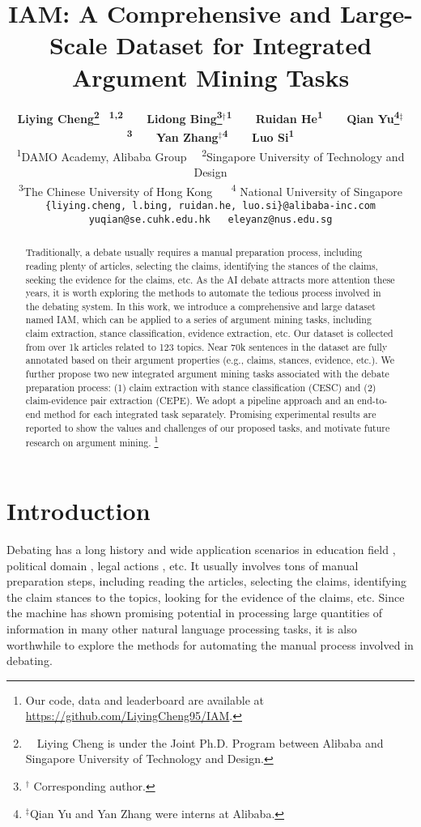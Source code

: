 \documentclass[11pt]{article}
\title{IAM: A Comprehensive and Large-Scale Dataset for Integrated Argument Mining Tasks}
\author{
\textbf{
Liying Cheng\thanks{~~Liying Cheng is under the Joint Ph.D. Program between Alibaba and Singapore University of Technology and Design.} \textsuperscript{\rm ~1,2}~~~ 
Lidong Bing\thanks{$^\dag$ Corresponding author.}$^\dag$\textsuperscript{\rm 1}~~~
Ruidan He\textsuperscript{\rm 1}~~~
Qian Yu\thanks{$^\ddag$Qian Yu and Yan Zhang were interns at Alibaba.}$^\ddag$\textsuperscript{\rm 3}~~~
Yan Zhang$^\ddag$\textsuperscript{\rm 4}~~~
Luo Si\textsuperscript{\rm 1}}\\
\textsuperscript{\rm 1}DAMO Academy, Alibaba Group~~
\textsuperscript{\rm 2}Singapore University of Technology and Design
\\
\textsuperscript{\rm 3}The Chinese University of Hong Kong ~~
\textsuperscript{\rm 4} National University of Singapore\\
{\tt\{liying.cheng, l.bing, ruidan.he, luo.si\}@alibaba-inc.com}
\\
{\tt yuqian@se.cuhk.edu.hk~~~eleyanz@nus.edu.sg}
}
\begin{document}
\maketitle
\begin{abstract}
Traditionally, a debate usually requires a manual preparation process, including reading plenty of articles, selecting the claims, identifying the stances of the claims, seeking the evidence for the claims, etc.
As the AI debate attracts more attention these years, it is worth exploring the methods to automate the tedious process involved in the debating system.
In this work, we introduce a comprehensive and large dataset named IAM, which can be applied to a series of argument mining tasks, including claim extraction, stance classification, evidence extraction, etc.
Our dataset is collected from over 1k articles related to 123 topics.
Near 70k sentences in the dataset are fully annotated based on their argument properties (e.g., claims, stances, evidence, etc.).
We further propose two new integrated argument mining tasks associated with the debate preparation process: (1) claim extraction with stance classification (CESC) and (2) claim-evidence pair extraction (CEPE).
We adopt a pipeline approach and an end-to-end method for each integrated task separately.
Promising experimental results are reported to show the values and challenges of our proposed tasks, and motivate future research on argument mining.
\footnote{Our code, data and leaderboard are available at \url{https://github.com/LiyingCheng95/IAM}.}

\end{abstract}

\section{Introduction}
Debating has a long history and wide application scenarios in education field \cite{stab2014identifying,persing2016end,stab2017parsing}, political domain \cite{lippi2016argument,duthie2016mining,menini2018never}, legal actions \cite{mochales2011argumentation,grabmair2015introducing,teruel2018increasing}, etc.
It usually involves tons of manual preparation steps, including reading the articles, selecting the claims, identifying the claim stances to the topics, looking for the evidence of the claims, etc.
Since the machine has shown promising potential in processing large quantities of information in many other natural language processing tasks, it is also worthwhile to explore the methods for automating the manual process involved in debating. 
\end{document}
